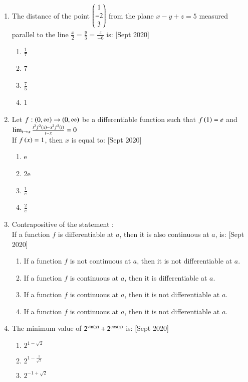 \documentclass[journal]{IEEEtran}
\begin{document}
\begin{enumerate}
	\item
	The distance of the point $\begin{pmatrix}1 \\ -2 \\ 3\end{pmatrix}$ from the plane $x-y+z = 5$ measured parallel to the line $\frac{x}{2} = \frac{y}{3} = \frac{z}{-6}$ is:
	\hfill [Sept 2020]
		\begin{enumerate}
			\item $\frac{1}{7}$
			\item 7
			\item $\frac{7}{5}$
			\item 1
		\end{enumerate}
	\item
	Let $f: \left(0, \infty\right) \to \left(0, \infty\right)
$ be a differentiable function such that $f\left(1\right) = e$ and \\
	$\lim_{t \to x} \frac{t^{2}f^{2}\left(x\right)-x^{2}f^{2}\left(t\right)}{t-x} = 0$ \\
	If $f\left(x\right) = 1$, then $x$ is equal to:
	\hfill [Sept 2020]
		\begin{enumerate}
			\item e
			\item 2e
			\item $\frac{1}{e}$
			\item $\frac{2}{e}$
		\end{enumerate}
	\item
	Contrapositive of the statement : \\
	If a function $f$ is differentiable at $a$, then it is also continuous at $a$, is:
	\hfill [Sept 2020]
		\begin{enumerate}
			\item If a function $f$ is not continuous at $a$, then it is not differentiable at $a$.
			\item If a function $f$ is continuous at $a$, then it is differentiable at $a$.
			\item If a function $f$ is continuous at $a$, then it is not differentiable at $a$.
			\item If a function $f$ is continuous at $a$, then it is not differentiable at $a$.
		\end{enumerate}
	\item
	The minimum value of $2^{\sin\left(x\right)}+2^{\cos\left(x\right)}$ is:
	\hfill [Sept 2020]
		\begin{enumerate}
			\item $2^{1-\sqrt{2}}$
			\item $2^{1 - \frac{1}{\sqrt{2}}}$
			\item $2^{-1+\sqrt{2}}$

\end{enumerate}
\end{enumerate}
\end{document}
